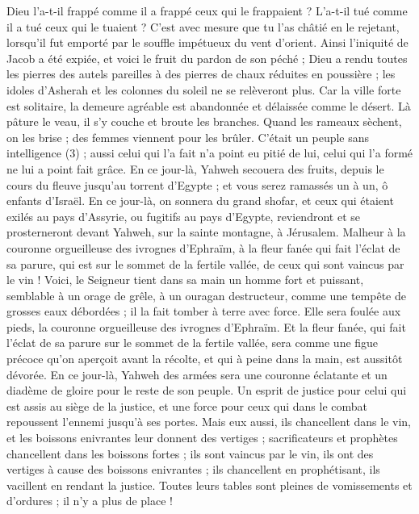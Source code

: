 \begin{multicols}{2}
Dieu l’a-t-il frappé comme il a frappé ceux qui le frappaient ? L’a-t-il tué comme il a tué ceux qui le tuaient ?
C’est avec mesure que tu l’as châtié en le rejetant, lorsqu’il fut emporté par le souffle impétueux du vent d’orient.
Ainsi l’iniquité de Jacob a été expiée, et voici le fruit du pardon de son péché ; Dieu a rendu toutes les pierres des autels pareilles à des pierres de chaux réduites en poussière ; les idoles d’Asherah et les colonnes du soleil ne se relèveront plus.
Car la ville forte est solitaire, la demeure agréable est abandonnée et délaissée comme le désert. Là pâture le veau, il s’y couche et broute les branches.
Quand les rameaux sèchent, on les brise ; des femmes viennent pour les brûler. C’était un peuple sans intelligence (3) ; aussi celui qui l’a fait n’a point eu pitié de lui, celui qui l’a formé ne lui a point fait grâce.
En ce jour-là, Yahweh secouera des fruits, depuis le cours du fleuve jusqu'au torrent d'Egypte ; et vous serez ramassés un à un, ô enfants d'Israël.
En ce jour-là, on sonnera du grand shofar, et ceux qui étaient exilés au pays d'Assyrie, ou fugitifs au pays d'Egypte, reviendront et se prosterneront devant Yahweh, sur la sainte montagne, à Jérusalem.
\VerseOne{}Malheur à la couronne orgueilleuse des ivrognes d'Ephraïm, à la fleur fanée qui fait l’éclat de sa parure, qui est sur le sommet de la fertile vallée, de ceux qui sont vaincus par le vin !
Voici, le Seigneur tient dans sa main un homme fort et puissant, semblable à un orage de grêle, à un ouragan destructeur, comme une tempête de grosses eaux débordées ; il la fait tomber à terre avec force.
Elle sera foulée aux pieds, la couronne orgueilleuse des ivrognes d'Ephraïm.
Et la fleur fanée, qui fait l’éclat de sa parure sur le sommet de la fertile vallée, sera comme une figue précoce qu’on aperçoit avant la récolte, et qui à peine dans la main, est aussitôt dévorée.
En ce jour-là, Yahweh des armées sera une couronne éclatante et un diadème de gloire pour le reste de son peuple.
Un esprit de justice pour celui qui est assis au siège de la justice, et une force pour ceux qui dans le combat repoussent l’ennemi jusqu’à ses portes.
Mais eux aussi, ils chancellent dans le vin, et les boissons enivrantes leur donnent des vertiges ; sacrificateurs et prophètes chancellent dans les boissons fortes ; ils sont vaincus par le vin, ils ont des vertiges à cause des boissons enivrantes ; ils chancellent en prophétisant, ils vacillent en rendant la justice.
Toutes leurs tables sont pleines de vomissements et d’ordures ; il n'y a plus de place !

\end{multicols}
